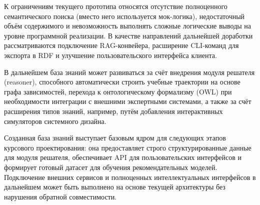 К ограничениям текущего прототипа относятся отсутствие полноценного семантического поиска (вместо него используется мок-логика), недостаточный объём содержимого и невозможность выполнять сложные логические выводы на уровне программной реализации. В качестве направлений дальнейшей доработки рассматриваются подключение RAG-конвейера, расширение CLI-команд для экспорта в RDF и улучшение пользовательского интерфейса клиента.

В дальнейшем база знаний может развиваться за счёт внедрения модуля решателя (reasoner), способного автоматически строить учебные траектории на основе графа зависимостей, перехода к онтологическому формализму (OWL) при необходимости интеграции с внешними экспертными системами, а также за счёт расширения типов знаний, например, путём добавления интерактивных симуляторов системного дизайна.

Созданная база знаний выступает базовым ядром для следующих этапов курсового проектирования: она предоставляет строго структурированные данные для модуля решателя, обеспечивает API для пользовательских интерфейсов и формирует готовый датасет для обучения рекомендательных моделей. Подключение внешних сервисов и полноценных интеллектуальных интерфейсов в дальнейшем может быть выполнено на основе текущей архитектуры без нарушения обратной совместимости.